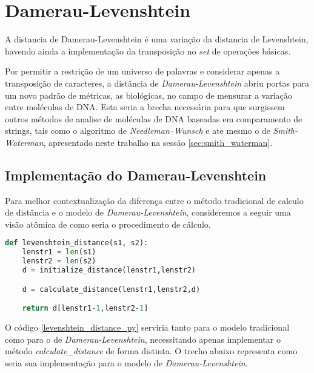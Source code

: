 \section{Damerau-Levenshtein} %
\label{sec:damerau_levenshtein}

A distancia de Damerau-Levenshtein é uma variação da distancia de Levenshtein\cite{levenshtein1965}, havendo ainda a implementação da transposição no \textit{set} de operações básicas.

Por permitir a restrição de um universo de palavras e considerar apenas a transposição de caracteres, a distância de \textit{Damerau-Levenshtein} abriu portas para um novo padrão de métricas, as biológicas, no campo de mensurar a variação entre moléculas de DNA. Esta seria a brecha necessária para que surgissem outros métodos de analise de moléculas de DNA baseadas em comparamento de strings, tais como o algoritmo de \textit{Needleman–Wunsch}\cite{needleman1970general} e ate mesmo o de \textit{Smith-Waterman}\cite{smith1981identification}, apresentado neste trabalho na sessão \ref{sec:smith_waterman}.

\subsection{Implementação do Damerau-Levenshtein} %
\label{sub:implementa_o_do_damerau_levenshtein}

Para melhor contextualização da diferença entre o método tradicional de calculo de distância e o modelo de \textit{Damerau-Levenshtein}, consideremos a seguir uma visão atômica de como seria o procedimento de câlculo.

\begin{lstlisting}[language=Python,label=levenshtein_distance_py,caption={Visão atômica do cálculo da distância de Levenshtein}]
def levenshtein_distance(s1, s2):
    lenstr1 = len(s1)
    lenstr2 = len(s2)
    d = initialize_distance(lenstr1,lenstr2)

	d = calculate_distance(lenstr1,lenstr2,d) 

    return d[lenstr1-1,lenstr2-1]
\end{lstlisting}

O código \ref{levenshtein_distance_py} serviria tanto para o modelo tradicional como para o de \textit{Damerau-Levenshtein}, necessitando apenas implementar o método \textit{calculate\_distance} de forma distinta. O trecho abaixo representa como seria sua implementação para o modelo de \textit{Damerau-Levenshtein}.

